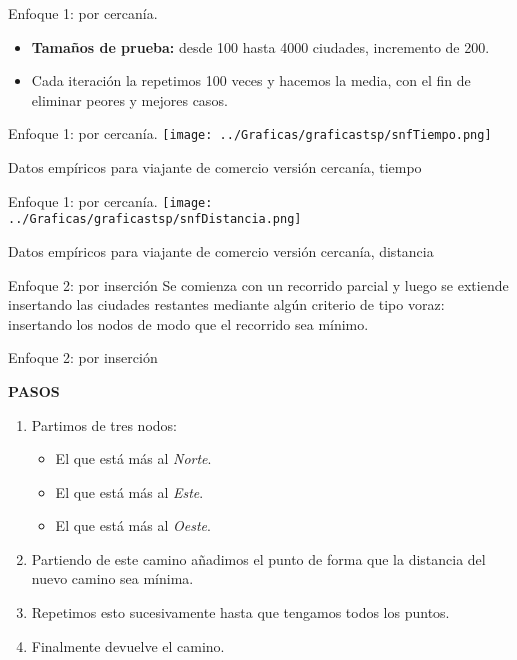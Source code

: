\documentclass[10pt, xcolor=table]{beamer}
\begin{document}
\begin{frame}{Enfoque 1: por cercanía. }
\begin{itemize}
	\item \textbf{Tamaños de prueba:} desde 100 hasta 4000 ciudades, incremento de 200.
	\item Cada iteración la repetimos 100 veces y hacemos la media, con el fin de eliminar peores y mejores casos.
\end{itemize}
\end{frame}

\begin{frame}[fragile]{Enfoque 1: por cercanía. }
\texttt{[image: ../Graficas/graficastsp/snfTiempo.png]}
\begin{center}
	\footnotesize{Datos empíricos para viajante de comercio versión cercanía, tiempo}
\end{center}
\end{frame}

\begin{frame}[fragile]{Enfoque 1: por cercanía. }
\texttt{[image: ../Graficas/graficastsp/snfDistancia.png]}
\begin{center}
	\footnotesize{Datos empíricos para viajante de comercio versión cercanía, distancia}
\end{center}
\end{frame}

\begin{frame}{Enfoque 2: por inserción}
Se comienza con un recorrido parcial y luego se extiende insertando las ciudades restantes mediante algún criterio de tipo voraz: insertando los nodos de modo que el recorrido sea mínimo.
\end{frame}

\begin{frame}{Enfoque 2: por inserción}
\begin{center}
\textbf{\large{PASOS}}
\end{center}
\begin{enumerate}
		\item Partimos de tres nodos: 
		\begin{itemize}
			\item El que está más al \textit{Norte}.
			\item El que está más al \textit{Este}. 
			\item El que está más al \textit{Oeste}.
		\end{itemize}
		\item Partiendo de este camino añadimos el punto de forma que la distancia del nuevo camino sea mínima.
		\item Repetimos esto sucesivamente hasta que tengamos todos los puntos.
		\item Finalmente devuelve el camino.
	\end{enumerate}
\end{frame}
\end{document}
